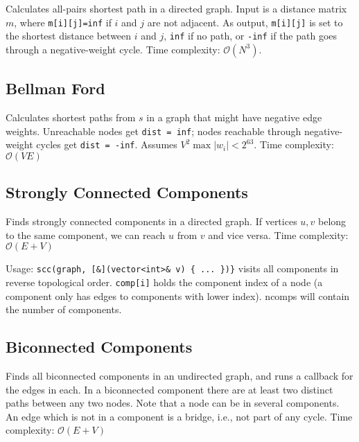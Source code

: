 \documentclass{article}
\begin{document}
Calculates all-pairs shortest path in a directed graph.
Input is a distance matrix $m$, where \lstinline{m[i][j]=inf} if $i$ and $j$ are not adjacent.
As output, \lstinline{m[i][j]} is set to the shortest distance between $i$ and $j$,
\lstinline{inf} if no path, or \lstinline{-inf} if the path goes through a negative-weight cycle.
Time complexity: $\mathcal{O}(N^3)$.




\subsection*{Bellman Ford}

Calculates shortest paths from $s$ in a graph that might have negative edge weights.
Unreachable nodes get \lstinline{dist = inf}; nodes reachable through negative-weight cycles get \lstinline{dist = -inf}.
Assumes $V^2 \max |w_i| < 2^{63}$. Time complexity: $\mathcal{O}(VE)$



\pagebreak



\subsection*{Strongly Connected Components}

Finds strongly connected components in a directed graph. If vertices $u, v$ belong to the same component, we can reach $u$ from $v$ and vice versa.
Time complexity: $\mathcal{O}(E + V)$

Usage: \lstinline|scc(graph, [&](vector<int>& v) { ... })}| visits all components
in reverse topological order. \texttt{comp[i]} holds the component
index of a node (a component only has edges to components with
lower index). ncomps will contain the number of components.




\subsection*{Biconnected Components}

Finds all biconnected components in an undirected graph, and
runs a callback for the edges in each. In a biconnected component there
are at least two distinct paths between any two nodes. Note that a node can
be in several components. An edge which is not in a component is a bridge,
i.e., not part of any cycle. Time complexity: $\mathcal{O}(E + V)$
\end{document}
